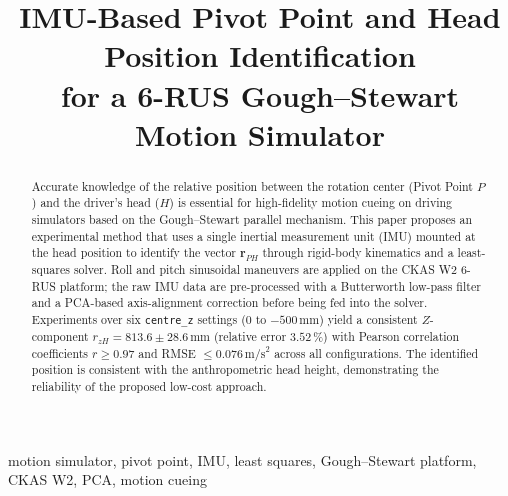 \documentclass[conference]{IEEEtran}
\newcommand{\vv}[1]{\bm{#1}}          %
\newcommand{\mm}{\,\text{mm}}
\newcommand{\rPH}{\vv{r}_{PH}}
\begin{document}
\title{%
  IMU-Based Pivot Point and Head Position Identification\\
  for a 6-RUS Gough--Stewart Motion Simulator%
}

\author{%
  \and
}

\maketitle

\begin{abstract}
Accurate knowledge of the relative position between the rotation center
(Pivot Point $P$) and the driver's head ($H$) is essential for
high-fidelity motion cueing on driving simulators based on the
Gough--Stewart parallel mechanism.
This paper proposes an experimental method that uses a single
inertial measurement unit (IMU) mounted at the head position to
identify the vector $\rPH$ through rigid-body kinematics and a
least-squares solver.
Roll and pitch sinusoidal maneuvers are applied on the CKAS W2 6-RUS
platform; the raw IMU data are pre-processed with a Butterworth
low-pass filter and a PCA-based axis-alignment correction before being
fed into the solver.
Experiments over six \texttt{centre\_z} settings
($0$ to $-500\mm$) yield a consistent $Z$-component
$r_{zH} = 813.6 \pm 28.6\mm$ (relative error $3.52\,\%$) with
Pearson correlation coefficients $r \ge 0.97$ and RMSE $\le
0.076\,\text{m/s}^2$ across all configurations.
The identified position is consistent with the anthropometric head
height, demonstrating the reliability of the proposed low-cost approach.
\end{abstract}

\begin{IEEEkeywords}
  motion simulator, pivot point, IMU, least squares,
  Gough--Stewart platform, CKAS W2, PCA, motion cueing
\end{IEEEkeywords}
\end{document}
